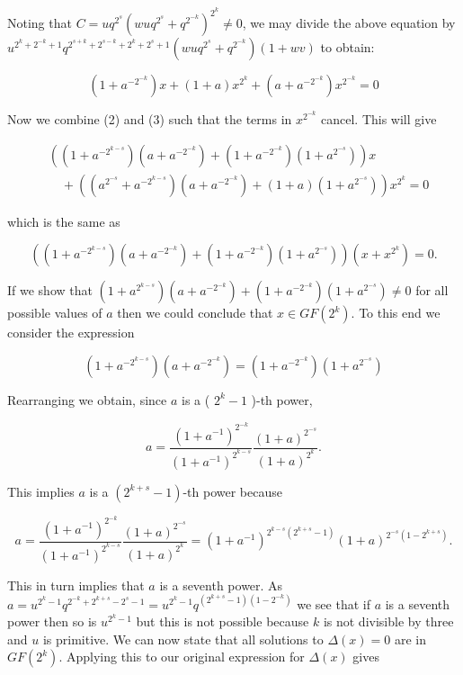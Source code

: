\documentclass[10pt]{article}
\begin{document}
Noting that $C=u q^{2^{s}}\left(w u q^{2^{s}}+q^{2^{-k}}\right)^{2^{k}} \neq 0$, we may divide the above equation by $u^{2^{k}+2^{-k}+1} q^{2^{s+k}+2^{s-k}+2^{k}+2^{s}+1}\left(w u q^{2^{s}}+q^{2^{-k}}\right)(1+w v)$ to obtain:


\begin{equation*}
\left(1+a^{-2^{-k}}\right) x+(1+a) x^{2^{k}}+\left(a+a^{-2^{-k}}\right) x^{2^{-k}}=0 \tag{3}
\end{equation*}


Now we combine (2) and (3) such that the terms in $x^{2^{-k}}$ cancel. This will give

$$
\begin{aligned}
& \left(\left(1+a^{-2^{k-s}}\right)\left(a+a^{-2^{-k}}\right)+\left(1+a^{-2^{-k}}\right)\left(1+a^{2^{-s}}\right)\right) x \\
& \quad+\left(\left(a^{2^{-s}}+a^{-2^{k-s}}\right)\left(a+a^{-2^{-k}}\right)+(1+a)\left(1+a^{2^{-s}}\right)\right) x^{2^{k}}=0
\end{aligned}
$$

which is the same as

$$
\left(\left(1+a^{-2^{k-s}}\right)\left(a+a^{-2^{-k}}\right)+\left(1+a^{-2^{-k}}\right)\left(1+a^{2^{-s}}\right)\right)\left(x+x^{2^{k}}\right)=0 .
$$

If we show that $\left(1+a^{2^{k-s}}\right)\left(a+a^{-2^{-k}}\right)+\left(1+a^{-2^{-k}}\right)\left(1+a^{2^{-s}}\right) \neq 0$ for all possible values of $a$ then we could conclude that $x \in G F\left(2^{k}\right)$. To this end we consider the expression

$$
\left(1+a^{-2^{k-s}}\right)\left(a+a^{-2^{-k}}\right)=\left(1+a^{-2^{-k}}\right)\left(1+a^{2^{-s}}\right)
$$

Rearranging we obtain, since $a$ is a ( $2^{k}-1$ )-th power,

$$
a=\frac{\left(1+a^{-1}\right)^{2^{-k}}}{\left(1+a^{-1}\right)^{2^{k-s}}} \frac{(1+a)^{2^{-s}}}{(1+a)^{2^{k}}} .
$$

This implies $a$ is a $\left(2^{k+s}-1\right)$-th power because

$$
a=\frac{\left(1+a^{-1}\right)^{2^{-k}}}{\left(1+a^{-1}\right)^{2^{k-s}}} \frac{(1+a)^{2^{-s}}}{(1+a)^{2^{k}}}=\left(1+a^{-1}\right)^{2^{k-s}\left(2^{k+s}-1\right)}(1+a)^{2^{-s}\left(1-2^{k+s}\right)} .
$$

This in turn implies that $a$ is a seventh power. As $a=u^{2^{k}-1} q^{2^{-k}+2^{k+s}-2^{s}-1}= u^{2^{k}-1} q^{\left(2^{k+s}-1\right)\left(1-2^{-k}\right)}$ we see that if $a$ is a seventh power then so is $u^{2^{k}-1}$ but this is not possible because $k$ is not divisible by three and $u$ is primitive. We can now state that all solutions to $\Delta(x)=0$ are in $G F\left(2^{k}\right)$. Applying this to our original expression for $\Delta(x)$ gives
\end{document}
